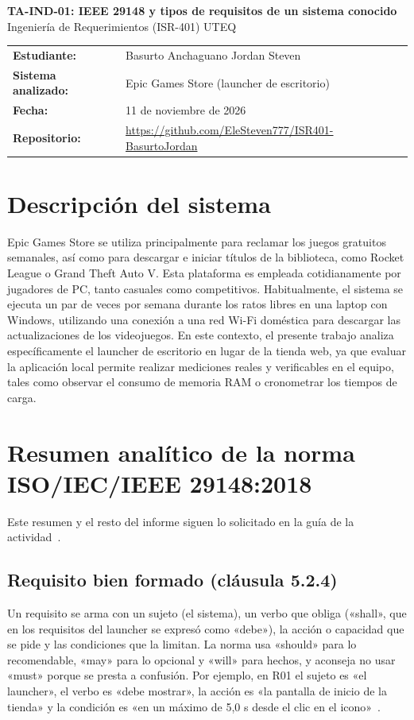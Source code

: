 \documentclass[10pt,a4paper]{article}
\begin{document}
{\LARGE\bfseries TA-IND-01: IEEE 29148 y tipos de requisitos de un sistema conocido}\\[3pt]
{\large Ingenier\'ia de Requerimientos (ISR-401) \textperiodcentered{} UTEQ}

\medskip
\begin{tabular}{@{}ll}
\textbf{Estudiante:} & Basurto Anchaguano Jordan Steven\\
\textbf{Sistema analizado:} & Epic Games Store (launcher de escritorio)\\
\textbf{Fecha:} & 11 de noviembre de 2026\\
\textbf{Repositorio:} & \url{https://github.com/EleSteven777/ISR401-BasurtoJordan}\\
\end{tabular}

\section{Descripci\'on del sistema}
Epic Games Store se utiliza principalmente para reclamar los juegos gratuitos semanales, así como para descargar e iniciar títulos de la biblioteca, como Rocket League o Grand Theft Auto V. Esta plataforma es empleada cotidianamente por jugadores de PC, tanto casuales como competitivos. Habitualmente, el sistema se ejecuta un par de veces por semana durante los ratos libres en una laptop con Windows, utilizando una conexión a una red Wi-Fi doméstica para descargar las actualizaciones de los videojuegos. En este contexto, el presente trabajo analiza específicamente el launcher de escritorio en lugar de la tienda web, ya que evaluar la aplicación local permite realizar mediciones reales y verificables en el equipo, tales como observar el consumo de memoria RAM o cronometrar los tiempos de carga.

\section{Resumen anal\'itico de la norma ISO/IEC/IEEE 29148:2018}
Este resumen y el resto del informe siguen lo solicitado en la gu\'ia de la actividad~\cite{guia}.

\subsection{Requisito bien formado (cl\'ausula 5.2.4)}
Un requisito se arma con un sujeto (el sistema), un verbo que obliga («shall», que en los requisitos del launcher se expresó como «debe»), la acción o capacidad que se pide y las condiciones que la limitan. La norma usa «should» para lo recomendable, «may» para lo opcional y «will» para hechos, y aconseja no usar «must» porque se presta a confusión. Por ejemplo, en R01 el sujeto es «el launcher», el verbo es «debe mostrar», la acción es «la pantalla de inicio de la tienda» y la condición es «en un máximo de 5,0 s desde el clic en el icono»~\cite[cl.~5.2.4]{iso29148}.
\end{document}
